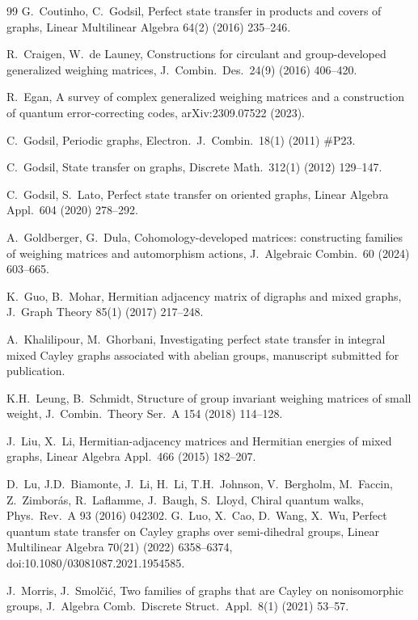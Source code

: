 \documentclass[preprint,11pt]{elsarticle}
\theoremstyle{definition}
\theoremstyle{remark}
\begin{document}
\begin{thebibliography}{99}
 G.\ Coutinho, C.\ Godsil, Perfect state transfer in products and covers of graphs, Linear Multilinear Algebra 64(2) (2016) 235--246.

 R.\ Craigen, W.\ de Launey, Constructions for circulant and group-developed generalized weighing matrices, J.\ Combin.\ Des.\ 24(9) (2016) 406--420.

 R.\ Egan, A survey of complex generalized weighing matrices and a construction of quantum error-correcting codes, arXiv:2309.07522 (2023).

 C.\ Godsil, Periodic graphs, Electron.\ J.\ Combin.\ 18(1) (2011) \#P23.

 C.\ Godsil, State transfer on graphs, Discrete Math.\ 312(1) (2012) 129--147.

 C.\ Godsil, S.\ Lato, Perfect state transfer on oriented graphs, Linear Algebra Appl.\ 604 (2020) 278--292.

 A.\ Goldberger, G.\ Dula, Cohomology-developed matrices: constructing families of weighing matrices and automorphism actions, J.\ Algebraic Combin.\ 60 (2024) 603--665.

 K.\ Guo, B.\ Mohar, Hermitian adjacency matrix of digraphs and mixed graphs, J.\ Graph Theory 85(1) (2017) 217--248.

 A.\ Khalilipour, M.\ Ghorbani, Investigating perfect state transfer in integral mixed Cayley graphs associated with abelian groups, manuscript submitted for publication.

 K.H.\ Leung, B.\ Schmidt, Structure of group invariant weighing matrices of small weight, J.\ Combin.\ Theory Ser.\ A 154 (2018) 114--128.

 J.\ Liu, X.\ Li, Hermitian-adjacency matrices and Hermitian energies of mixed graphs, Linear Algebra Appl.\ 466 (2015) 182--207.

 D.\ Lu, J.D.\ Biamonte, J.\ Li, H.\ Li, T.H.\ Johnson, V.\ Bergholm, M.\ Faccin, Z.\ Zimbor\'as, R.\ Laflamme, J.\ Baugh, S.\ Lloyd, Chiral quantum walks, Phys.\ Rev.\ A 93 (2016) 042302.
 G.\ Luo, X.\ Cao, D.\ Wang, X.\ Wu, Perfect quantum state transfer on Cayley graphs over semi-dihedral groups, Linear Multilinear Algebra 70(21) (2022) 6358--6374, doi:10.1080/03081087.2021.1954585.

 J.\ Morris, J.\ Smol\v{c}i\'c, Two families of graphs that are Cayley on nonisomorphic groups, J.\ Algebra Comb.\ Discrete Struct.\ Appl.\ 8(1) (2021) 53--57.


\end{thebibliography}
\end{document}
